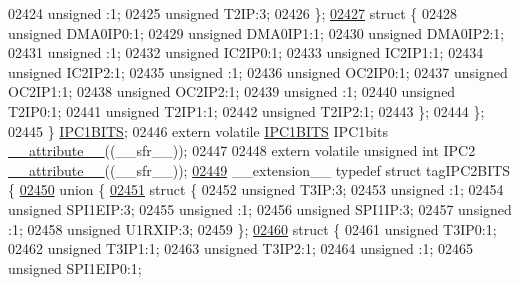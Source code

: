 \begin{DoxyCode}
02424       \textcolor{keywordtype}{unsigned} :1;
02425       \textcolor{keywordtype}{unsigned} T2IP:3;
02426     \};
\hypertarget{a00009_source_l02427}{}\hyperlink{a00009}{02427}     \textcolor{keyword}{struct }\{
02428       \textcolor{keywordtype}{unsigned} DMA0IP0:1;
02429       \textcolor{keywordtype}{unsigned} DMA0IP1:1;
02430       \textcolor{keywordtype}{unsigned} DMA0IP2:1;
02431       \textcolor{keywordtype}{unsigned} :1;
02432       \textcolor{keywordtype}{unsigned} IC2IP0:1;
02433       \textcolor{keywordtype}{unsigned} IC2IP1:1;
02434       \textcolor{keywordtype}{unsigned} IC2IP2:1;
02435       \textcolor{keywordtype}{unsigned} :1;
02436       \textcolor{keywordtype}{unsigned} OC2IP0:1;
02437       \textcolor{keywordtype}{unsigned} OC2IP1:1;
02438       \textcolor{keywordtype}{unsigned} OC2IP2:1;
02439       \textcolor{keywordtype}{unsigned} :1;
02440       \textcolor{keywordtype}{unsigned} T2IP0:1;
02441       \textcolor{keywordtype}{unsigned} T2IP1:1;
02442       \textcolor{keywordtype}{unsigned} T2IP2:1;
02443     \};
02444   \};
02445 \} \hyperlink{a00008_d1/d0b/a00529}{IPC1BITS};
02446 \textcolor{keyword}{extern} \textcolor{keyword}{volatile} \hyperlink{a00008_d1/d0b/a00529}{IPC1BITS} IPC1bits \hyperlink{a00009_a493c46f03454991ccc5aa7a6e1dfb2a7}{\_\_attribute\_\_}((\_\_sfr\_\_));
02447 
02448 \textcolor{keyword}{extern} \textcolor{keyword}{volatile} \textcolor{keywordtype}{unsigned} \textcolor{keywordtype}{int}  IPC2 \hyperlink{a00009_a493c46f03454991ccc5aa7a6e1dfb2a7}{\_\_attribute\_\_}((\_\_sfr\_\_));
\hypertarget{a00009_source_l02449}{}\hyperlink{a00008}{02449} \_\_extension\_\_ \textcolor{keyword}{typedef} \textcolor{keyword}{struct }tagIPC2BITS \{
\hypertarget{a00009_source_l02450}{}\hyperlink{a00009}{02450}   \textcolor{keyword}{union }\{
\hypertarget{a00009_source_l02451}{}\hyperlink{a00009}{02451}     \textcolor{keyword}{struct }\{
02452       \textcolor{keywordtype}{unsigned} T3IP:3;
02453       \textcolor{keywordtype}{unsigned} :1;
02454       \textcolor{keywordtype}{unsigned} SPI1EIP:3;
02455       \textcolor{keywordtype}{unsigned} :1;
02456       \textcolor{keywordtype}{unsigned} SPI1IP:3;
02457       \textcolor{keywordtype}{unsigned} :1;
02458       \textcolor{keywordtype}{unsigned} U1RXIP:3;
02459     \};
\hypertarget{a00009_source_l02460}{}\hyperlink{a00009}{02460}     \textcolor{keyword}{struct }\{
02461       \textcolor{keywordtype}{unsigned} T3IP0:1;
02462       \textcolor{keywordtype}{unsigned} T3IP1:1;
02463       \textcolor{keywordtype}{unsigned} T3IP2:1;
02464       \textcolor{keywordtype}{unsigned} :1;
02465       \textcolor{keywordtype}{unsigned} SPI1EIP0:1;

\end{DoxyCode}
